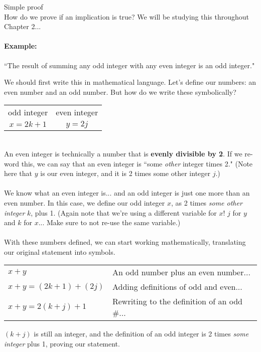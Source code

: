 \documentclass[../Template-Assignment.tex]{subfiles}
\begin{document}
        \begin{intro}{Simple proof} ~\\
            How do we prove if an implication is true? We will be studying
            this throughout Chapter 2...

            \paragraph{Example:}
            ``The result of summing any odd integer with any even integer is an odd integer."

            We should first write this in mathematical language. Let's define our numbers:
            an even number and an odd number. But how do we write these symbolically?

            \begin{center}
                \begin{tabular}{c c}
                    odd integer & even integer
                    \\
                    $x = 2k+1$ & $y = 2j$
                \end{tabular}
            \end{center}
            ~\\
            An even integer is technically a number that is \textbf{evenly divisible by 2}.
            If we re-word this, we can say that an even integer is ``some \textit{other} integer
            times 2." (Note here that $y$ is our even integer, and it is 2 times some other integer $j$.)
            ~\\~\\
            We know what an even integer is... and an odd integer is just one more than an even number.
            In this case, we define our odd integer $x$, as 2 times \textit{some other integer} $k$, plus 1.
            (Again note that we're using a different variable for $x$! $j$ for $y$ and $k$ for $x$...
            Make sure to not re-use the same variable.)
            ~\\~\\
            With these numbers defined, we can start working mathematically, translating our original
            statement into symbols.

            \begin{center}
                \begin{tabular}{l l}
                    $x + y$         &       An odd number plus an even number...
                    \\
                    $x + y = (2k+1) + (2j) $    &   Adding definitions of odd and even...
                    \\
                    $x + y = 2(k + j) + 1 $     &   Rewriting to the definition of an odd \#...
                \end{tabular}
            \end{center}

            $(k+j)$ is still an integer, and the definition of an odd integer
            is 2 times \textit{some integer} plus 1, proving our statement.

        \end{intro}
\end{document}
